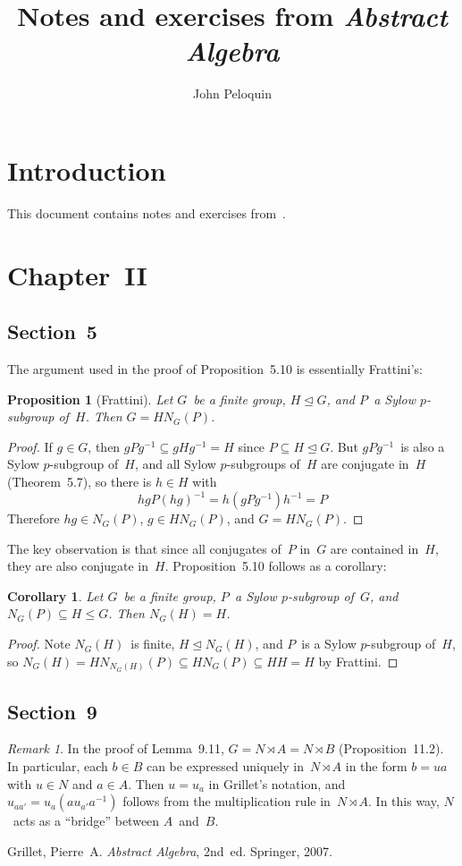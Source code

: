 \documentclass[letterpaper,12pt]{article}
\title{Notes and exercises from \textit{Abstract Algebra}}
\author{John Peloquin}
\date{}
\newcommand{\subgroupeq}{\le}
\newcommand{\nsubgroupeq}{\trianglelefteq}
\newcommand{\lsemidirect}{\rtimes}
\theoremstyle{definition}
\theoremstyle{remark}
\newtheorem*{rmk}{Remark}
\theoremstyle{plain}
\newtheorem*{prop}{Proposition}
\newtheorem*{cor}{Corollary}
\begin{document}
\maketitle

\section*{Introduction}
This document contains notes and exercises from~\cite{grillet}.

\section*{Chapter~II}
\subsection*{Section~5}

The argument used in the proof of Proposition~5.10 is essentially Frattini's:
\begin{prop}[Frattini]
Let \(G\)~be a finite group, \(H\nsubgroupeq G\), and \(P\)~a Sylow \(p\)-subgroup of~\(H\). Then \(G=HN_G(P)\).
\end{prop}
\begin{proof}
If \(g\in G\), then \(gPg^{-1}\subseteq gHg^{-1}=H\) since \(P\subseteq H\nsubgroupeq G\). But \(gPg^{-1}\)~is also a Sylow \(p\)-subgroup of~\(H\), and all Sylow \(p\)-subgroups of~\(H\) are conjugate in~\(H\) (Theorem~5.7), so there is \(h\in H\) with
\[hgP(hg)^{-1}=h(gPg^{-1})h^{-1}=P\]
Therefore \(hg\in N_G(P)\), \(g\in HN_G(P)\), and \(G=HN_G(P)\).
\end{proof}
\noindent The key observation is that since all conjugates of~\(P\) in~\(G\) are contained in~\(H\), they are also conjugate in~\(H\). Proposition~5.10 follows as a corollary:
\begin{cor}
Let \(G\)~be a finite group, \(P\)~a Sylow \(p\)-subgroup of~\(G\), and \(N_G(P)\subseteq H\subgroupeq G\). Then \(N_G(H)=H\).
\end{cor}
\begin{proof}
Note \(N_G(H)\)~is finite, \(H\nsubgroupeq N_G(H)\), and \(P\)~is a Sylow \(p\)-subgroup of~\(H\), so \(N_G(H)=HN_{N_G(H)}(P)\subseteq HN_G(P)\subseteq HH=H\) by Frattini.
\end{proof}

\subsection*{Section~9}
\begin{rmk}
In the proof of Lemma~9.11, \(G=N\lsemidirect A=N\lsemidirect B\) (Proposition~11.2). In particular, each \(b\in B\) can be expressed uniquely in~\(N\lsemidirect A\) in the form \(b=ua\) with \(u\in N\) and \(a\in A\). Then \(u=u_a\) in Grillet's notation, and \(u_{aa'}=u_a(au_{a'}a^{-1})\) follows from the multiplication rule in~\(N\lsemidirect A\). In this way, \(N\)~acts as a ``bridge'' between \(A\)~and~\(B\).
\end{rmk}

\begin{thebibliography}{0}
 Grillet, Pierre~A. \textit{Abstract Algebra}, 2nd~ed. Springer, 2007.
\end{thebibliography}
\end{document}
